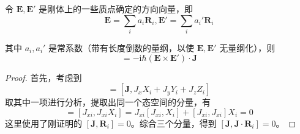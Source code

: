 \documentclass[cn,10pt,math=newtx,citestyle=gb7714-2015,bibstyle=gb7714-2015]{elegantbook}
\def\bm{\boldsymbol}
\def\i{\mathrm i}
\begin{document}
\begin{lemma}[总角动量在刚体坐标系下的分量的对易关系]\label{lem:ttl_anglr_mmntm_rgd_bdy_cmmt}
令 $\bm E,\bm E'$ 是刚体上的一些质点确定的方向向量，即
\begin{equation}
    \bm E = \sum_i a_i\bm R_i, \bm E' = \sum_i a_i'\bm R_i
\end{equation}

其中 $a_i,a_i'$ 是常系数（带有长度倒数的量纲，以使 $\bm E,\bm E'$ 无量纲化），则
\begin{equation}
    [\bm J\cdot\bm E,\bm J\cdot\bm E'] = -\i\hbar(\bm E\times\bm E')\cdot\bm J
\end{equation}
\end{lemma}
\begin{proof}
    首先，考虑到
    \begin{equation}
        [\bm J,\bm J\cdot\bm R_i] = [\bm J,J_xX_i+J_yY_i+J_zZ_i]
    \end{equation}
    取其中一项进行分析，提取出同一个态空间的分量，有
    \begin{equation}
        [\bm J,J_xX_i] = [J_{xi},J_{xi}X_i] = J_{xi}[J_{xi},X_i] + [J_{xi},J_{xi}]X_i = 0
    \end{equation}
    这里使用了刚证明的 $[\bm J,\bm R_i]=0$。综合三个分量，得到 $[\bm J,\bm J\cdot \bm R_i]=0$。
    

\end{proof}
\end{document}

